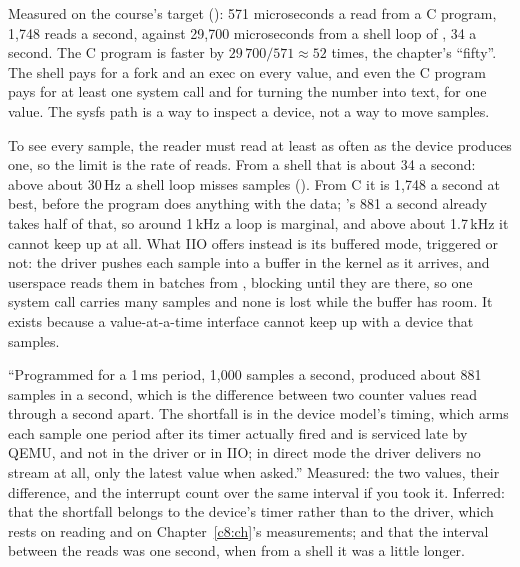  Measured on the course's target (): 571 microseconds a read from a C
program, 1,748 reads a second, against 29,700 microseconds from a shell loop of , 34 a
second. The C program is faster by $29\,700 / 571 \approx 52$ times, the chapter's ``fifty''. The
shell pays for a fork and an exec on every value, and even the C program pays for at least one
system call and for turning the number into text, for one value. The sysfs path is a way to
inspect a device, not a way to move samples.

 To see every sample, the reader must read at least as often as the device produces one,
so the limit is the rate of reads. From a shell that is about 34 a second: above about 30\,Hz a shell
loop misses samples (). From C it is 1,748 a second at best, before the program
does anything with the data; 's 881 a second already takes half of that, so around
1\,kHz a loop is marginal, and above about 1.7\,kHz it cannot keep up at all. What IIO offers
instead is its buffered mode, triggered or not: the driver pushes each sample into a buffer in the
kernel as it arrives, and userspace reads them in batches from , blocking
until they are there, so one system call carries many samples and none is lost while the buffer has
room. It exists because a value-at-a-time interface cannot keep up with a device that samples.

 ``Programmed for a 1\,ms period, 1,000 samples a second,  produced about 881
samples in a second, which is the difference between two counter values read through
 a second apart. The shortfall is in the device model's timing, which arms each
sample one period after its timer actually fired and is serviced late by QEMU, and not in the driver
or in IIO; in direct mode the driver delivers no stream at all, only the latest value when asked.''
Measured: the two values, their difference, and the interrupt count over the same interval if you
took it. Inferred: that the shortfall belongs to the device's timer rather than to the driver, which
rests on reading  and on Chapter~\ref{c8:ch}'s measurements; and that the interval
between the reads was one second, when from a shell it was a little longer.
